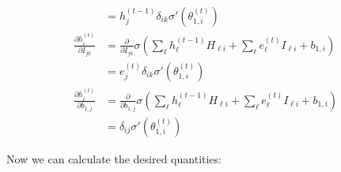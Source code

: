 \documentclass{article}
\begin{document}
\begin{itemize}
\begin{align*}
        &= h_j^{(t-1)}\delta_{ik} \sigma'(\theta_{1, i}^{(t)}) \\
        \frac{\partial h^{(t)}_i}{\partial I_{jk}} &= \frac{\partial}{\partial I_{jk}} \sigma(\sum_\ell h^{(t-1)}_\ell H_{\ell i} + \sum_\ell e^{(t)}_\ell I_{\ell i} + b_{1, i}) \\
        &= e_j^{(t)}\delta_{ik} \sigma'(\theta_{1, i}^{(t)}) \\
        \frac{\partial h^{(t)}_i}{\partial b_{1,j}} &= \frac{\partial}{\partial b_{1,j}} \sigma(\sum_\ell h^{(t-1)}_\ell H_{\ell i} + \sum_\ell e^{(t)}_\ell I_{\ell i} + b_{1, i}) \\
        &= \delta_{ij} \sigma'(\theta_{1, i}^{(t)})
    \end{align*}
    
    
    Now we can calculate the desired quantities:
    

\end{itemize}
\end{document}
